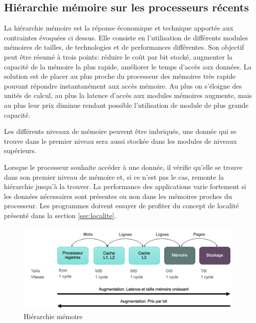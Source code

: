 \subsection{Hiérarchie mémoire sur les processeurs récents}

La hiérarchie mémoire est la réponse économique et technique apportée aux contraintes évoquées ci dessus. Elle consiste en l'utilisation de différents modules mémoires de tailles, de technologies et de performances différentes. Son objectif peut être résumé à trois points: réduire le coût par bit stocké, augmenter la capacité de la mémoire la plus rapide, améliorer le temps d'accès aux données. La solution est de placer au plus proche du processeur des mémoires très rapide pouvant répondre instantanément aux accès mémoire. Au plus on s'éloigne des unités de calcul, au plus la latence d'accès aux modules mémoires augmente, mais au plus leur prix diminue rendant possible l'utilisation de module de plus grande capacité.


Les différents niveaux de mémoire peuvent être imbriqués, une donnée qui se trouve dans le premier niveau sera aussi stockée dans les modules de niveaux supérieurs.

Lorsque le processeur souhaite accéder à une donnée, il vérifie qu'elle se trouve dans son premier niveau de mémoire et, si ce n'est pas le cas, remonte la hiérarchie jusqu'à la trouver. La performance des applications varie fortement si les données nécessaires sont présentes ou non dans les mémoires proches du processeur. Les programmes doivent essayer de profiter du concept de localité présenté dans la section \autoref{sec:localite}.
\begin{figure}
    \center
    \includegraphics[width=14cm]{images/memory_hierarchy.png}
    \caption{\label{pic:cpuvsmemory} Hiérarchie mémoire}
\end{figure}





